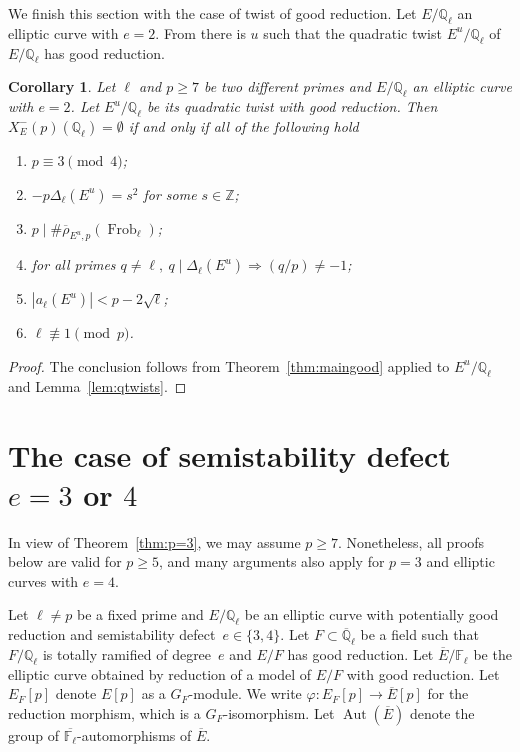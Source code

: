 \documentclass[12pt]{amsart}
\numberwithin{equation}{section}
\newtheorem{corollary}[equation]{Corollary}
\theoremstyle{definition}
\newcommand{\F}{\mathbb{F}}
\newcommand{\Q}{\mathbb{Q}}
\newcommand{\Z}{\mathbb{Z}}
\newcommand{\rhobar}{{\overline{\rho}}}
\newcommand{\Qbar}{{\overline{\Q}}}
\DeclareMathOperator{\Frob}{Frob}
\newcommand{\Ebar}{{\overline{E}}}
\DeclareMathOperator{\Aut}{Aut}
\begin{document}
We finish this section with the case of twist of good reduction. Let $E/\Q_\ell$ an elliptic curve with $e=2$. From \cite[Lemmas 3 and 4]{symplectic} there is $u$ such that the quadratic twist $E^u/\Q_\ell$ of~$E/\Q_\ell$ has good reduction.
\begin{corollary}\label{cor:e2}
Let $\ell$ and $p \geq 7$ be two different
primes and $E/\Q_\ell$ an elliptic curve with $e=2$. Let $E^u/\Q_\ell$ be its quadratic twist with good reduction. 
Then $X_E^{-}(p)(\Q_\ell)= \emptyset$ if and only if all of the following hold
\begin{enumerate}
\item $p \equiv 3 \pmod{4}$; 
 \item $-p\Delta_\ell(E^u)=s^2$ for some $s \in \Z$;
\item $p\mid \#\rhobar_{E^u,p}(\Frob_\ell)$;
\item  for all primes $q\neq \ell, \:q \mid \Delta_\ell(E^u) \Rightarrow (q/p)\neq -1$; 
\item $|a_\ell(E^u) |< p-2\sqrt{\ell}$; 
\item $\ell \not\equiv 1 \pmod{p}$. 
\end{enumerate} 
\end{corollary}
\begin{proof} 
The conclusion follows from Theorem~\ref{thm:maingood} applied to $E^u/\Q_\ell$ and Lemma~\ref{lem:qtwists}.
\end{proof}
\vspace{-5mm}
\section{The case of semistability defect \texorpdfstring{$e=3$ or $4$}{}}
\label{sec:non-ab}

In view of Theorem~\ref{thm:p=3}, we may assume $p \geq 7$. Nonetheless, all proofs below are valid for $p \geq 5$, and many arguments also apply for $p=3$ and elliptic curves with $e=4$.

Let $\ell \neq p$ be a fixed prime and $E/\Q_\ell$ be an elliptic curve with potentially good reduction and semistability defect~$e \in \{3,4\} $. Let $F \subset \Qbar_\ell$ be a field such that $F/\Q_\ell$ is totally ramified of degree~$e$ and $E/F$ has good reduction.
Let $\Ebar / \F_\ell$ be the elliptic curve
obtained by reduction of a model of $E / F$ with good reduction.
Let $E_F[p]$ denote $E[p]$ as a $G_F$-module.
We write $\varphi : E_F[p] \rightarrow \overline{E}[p]$ for
the reduction morphism, which is a  $G_F$-isomorphism.
Let $\Aut(\Ebar)$ denote the group of $\overline{\F_\ell}$-automorphisms of $\Ebar$.
\end{document}
